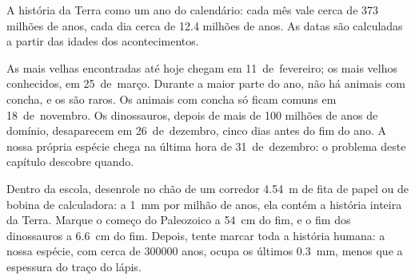 \begin{omfigure}

{\small A história da Terra como um ano do calendário: cada mês vale cerca
de \num{373} milhões de anos, cada dia cerca de \num{12.4} milhões de
anos. As datas são calculadas a partir das idades dos acontecimentos.}
\label{fig:g7:geological-time:calendar}
\end{omfigure}

As  mais velhas encontradas até hoje chegam em 11~de~fevereiro; os
 mais velhos conhecidos, em 25~de~março. Durante a maior parte do
ano, não há animais com concha, e os  são raros. Os animais com
concha só ficam comuns em 18~de~novembro. Os dinossauros, depois de mais
de \num{100} milhões de anos de domínio, desaparecem em 26~de~dezembro,
cinco dias antes do fim do ano. A nossa própria espécie chega na última
hora de 31~de~dezembro: o problema deste capítulo descobre quando.

\begin{inthelab}
Dentro da escola, desenrole no chão de um corredor \qty{4.54}{m} de fita
de papel ou de bobina de calculadora: a \qty{1}{mm} por milhão de anos,
ela contém a história inteira da Terra. Marque o começo do Paleozoico a
\qty{54}{cm} do fim, e o fim dos dinossauros a \qty{6.6}{cm} do fim.
Depois, tente marcar toda a história humana: a nossa espécie, com cerca
de \num{300000} anos, ocupa os últimos \qty{0.3}{mm}, menos que a
espessura do traço do lápis.
\end{inthelab}

